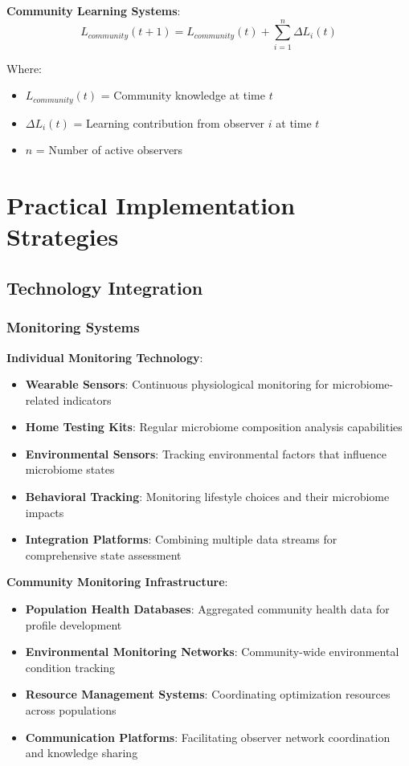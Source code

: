 \documentclass[12pt,a4paper]{article}
\begin{document}
\textbf{Community Learning Systems}:
\begin{equation}
L_{community}(t+1) = L_{community}(t) + \sum_{i=1}^{n} \Delta L_i(t)
\end{equation}

Where:
\begin{itemize}
\item $L_{community}(t)$ = Community knowledge at time $t$
\item $\Delta L_i(t)$ = Learning contribution from observer $i$ at time $t$
\item $n$ = Number of active observers
\end{itemize}

\section{Practical Implementation Strategies}

\subsection{Technology Integration}

\subsubsection{Monitoring Systems}

\textbf{Individual Monitoring Technology}:
\begin{itemize}
\item \textbf{Wearable Sensors}: Continuous physiological monitoring for microbiome-related indicators
\item \textbf{Home Testing Kits}: Regular microbiome composition analysis capabilities
\item \textbf{Environmental Sensors}: Tracking environmental factors that influence microbiome states
\item \textbf{Behavioral Tracking}: Monitoring lifestyle choices and their microbiome impacts
\item \textbf{Integration Platforms}: Combining multiple data streams for comprehensive state assessment
\end{itemize}

\textbf{Community Monitoring Infrastructure}:
\begin{itemize}
\item \textbf{Population Health Databases}: Aggregated community health data for profile development
\item \textbf{Environmental Monitoring Networks}: Community-wide environmental condition tracking
\item \textbf{Resource Management Systems}: Coordinating optimization resources across populations
\item \textbf{Communication Platforms}: Facilitating observer network coordination and knowledge sharing
\end{itemize}
\end{document}
